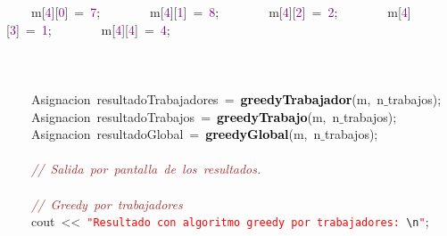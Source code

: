 \mbox{}\ \ \ \ m\textcolor{BrickRed}{[}\textcolor{Purple}{4}\textcolor{BrickRed}{][}\textcolor{Purple}{0}\textcolor{BrickRed}{]}\ \textcolor{BrickRed}{=}\ \textcolor{Purple}{7}\textcolor{BrickRed}{;}\ \ \ \ \ \ \ \ m\textcolor{BrickRed}{[}\textcolor{Purple}{4}\textcolor{BrickRed}{][}\textcolor{Purple}{1}\textcolor{BrickRed}{]}\ \textcolor{BrickRed}{=}\ \textcolor{Purple}{8}\textcolor{BrickRed}{;}\ \ \ \ \ \ \ \ m\textcolor{BrickRed}{[}\textcolor{Purple}{4}\textcolor{BrickRed}{][}\textcolor{Purple}{2}\textcolor{BrickRed}{]}\ \textcolor{BrickRed}{=}\ \textcolor{Purple}{2}\textcolor{BrickRed}{;}\ \ \ \ \ \ \ \ m\textcolor{BrickRed}{[}\textcolor{Purple}{4}\textcolor{BrickRed}{][}\textcolor{Purple}{3}\textcolor{BrickRed}{]}\ \textcolor{BrickRed}{=}\ \textcolor{Purple}{1}\textcolor{BrickRed}{;}\ \ \ \ \ \ \ \ m\textcolor{BrickRed}{[}\textcolor{Purple}{4}\textcolor{BrickRed}{][}\textcolor{Purple}{4}\textcolor{BrickRed}{]}\ \textcolor{BrickRed}{=}\ \textcolor{Purple}{4}\textcolor{BrickRed}{;}\  \\
\mbox{}\ \ \ \  \\
\mbox{}\ \ \ \  \\
\mbox{} \\
\mbox{}\ \ \ \ \textcolor{TealBlue}{Asignacion}\ resultadoTrabajadores\ \textcolor{BrickRed}{=}\ \textbf{\textcolor{Black}{greedyTrabajador}}\textcolor{BrickRed}{(}m\textcolor{BrickRed}{,}\ n$\_$trabajos\textcolor{BrickRed}{);}\  \\
\mbox{}\ \ \ \ \textcolor{TealBlue}{Asignacion}\ resultadoTrabajos\ \textcolor{BrickRed}{=}\ \textbf{\textcolor{Black}{greedyTrabajo}}\textcolor{BrickRed}{(}m\textcolor{BrickRed}{,}\ n$\_$trabajos\textcolor{BrickRed}{);}\  \\
\mbox{}\ \ \ \ \textcolor{TealBlue}{Asignacion}\ resultadoGlobal\ \textcolor{BrickRed}{=}\ \textbf{\textcolor{Black}{greedyGlobal}}\textcolor{BrickRed}{(}m\textcolor{BrickRed}{,}\ n$\_$trabajos\textcolor{BrickRed}{);}\  \\
\mbox{} \\
\mbox{}\ \ \ \ \textit{\textcolor{Brown}{//\ Salida\ por\ pantalla\ de\ los\ resultados.\ }} \\
\mbox{} \\
\mbox{}\ \ \ \ \textit{\textcolor{Brown}{//\ Greedy\ por\ trabajadores}} \\
\mbox{}\ \ \ \ cout\ \textcolor{BrickRed}{\textless{}\textless{}}\ \texttt{\textcolor{Red}{"{}Resultado\ con\ algoritmo\ greedy\ por\ trabajadores:\ }}\texttt{\textcolor{CarnationPink}{\textbackslash{}n}}\texttt{\textcolor{Red}{"{}}}\textcolor{BrickRed}{;}\  \\
